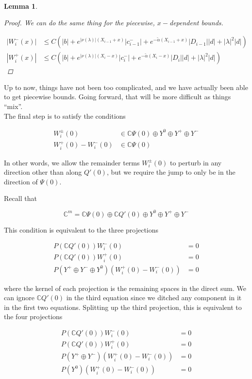 \documentclass[12pt]{article}
\def\C{{\mathbb C}}
\newtheorem{lemma}{Lemma}
\begin{document}
\begin{lemma}
\begin{proof}
We can do the same thing for the piecewise, $x-$dependent bounds.

\begin{align*}
|W_i^-(x)| &\leq C ( |b| + e^{|\nu(\lambda)|(X_{i-1} + x)} |c_{i-1}^-| + e^{-\tilde{\alpha}(X_{i-1} + x)}|D_{i-1}||d| + |\lambda|^2 |d| ) \\
|W_i^+(x)| &\leq C ( |b| + e^{|\nu(\lambda)|(X_i - x)} |c_i^-| + e^{-\tilde{\alpha}(X_i - x)}|D_i||d| + |\lambda|^2 |d| )
\end{align*}

\end{proof}
\end{lemma}

Up to now, things have not been too complicated, and we have actually been able to get piecewise bounds. Going forward, that will be more difficult as things ``mix''.\\

The final step is to satisfy the conditions

\begin{align*}
W_i^\pm(0) &\in \C \Psi(0) \oplus Y^0 \oplus Y^+ \oplus Y^- \\
W_i^+(0) - W_i^-(0) &\in \C \Psi(0)
\end{align*}

In other words, we allow the remainder terms $W_i^\pm(0)$ to perturb in any direction other than along $Q'(0)$, but we require the jump to only be in the direction of $\Psi(0)$.

Recall that

\[
\C^m = \C \Psi(0) \oplus \C Q'(0) \oplus Y^0 \oplus Y^+ \oplus Y^- 
\]

This condition is equivalent to the three projections

\begin{align*}
P(\C Q'(0))W_i^-(0) &= 0 \\
P(\C Q'(0))W_i^+(0) &= 0 \\
P(Y^+ \oplus Y^- \oplus Y^0) ( W_i^+(0) - W_i^-(0) ) &= 0
\end{align*}

where the kernel of each projection is the remaining spaces in the direct sum. We can ignore $\C Q'(0)$ in the third equation since we ditched any component in it in the first two equations. Splitting up the third projection, this is equivalent to the four projections

\begin{align*}
P(\C Q'(0))W_i^-(0) &= 0 \\
P(\C Q'(0))W_i^+(0) &= 0 \\
P(Y^+ \oplus Y^-) ( W_i^+(0) - W_i^-(0) ) &= 0 \\
P(Y^0) ( W_i^+(0) - W_i^-(0) ) &= 0
\end{align*}
\end{document}
